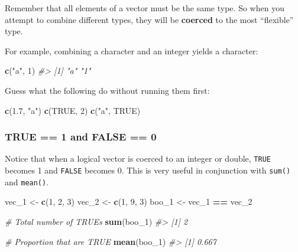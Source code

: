 \documentclass[]{book}
\newenvironment{Shaded}{\begin{snugshade}}{\end{snugshade}}
\newcommand{\KeywordTok}[1]{\textcolor[rgb]{0.13,0.29,0.53}{\textbf{#1}}}
\newcommand{\DecValTok}[1]{\textcolor[rgb]{0.00,0.00,0.81}{#1}}
\newcommand{\FloatTok}[1]{\textcolor[rgb]{0.00,0.00,0.81}{#1}}
\newcommand{\StringTok}[1]{\textcolor[rgb]{0.31,0.60,0.02}{#1}}
\newcommand{\CommentTok}[1]{\textcolor[rgb]{0.56,0.35,0.01}{\textit{#1}}}
\newcommand{\OtherTok}[1]{\textcolor[rgb]{0.56,0.35,0.01}{#1}}
\newcommand{\OperatorTok}[1]{\textcolor[rgb]{0.81,0.36,0.00}{\textbf{#1}}}
\newcommand{\NormalTok}[1]{#1}
\begin{document}
Remember that all elements of a vector must be the same type. So when
you attempt to combine different types, they will be \textbf{coerced} to
the most ``flexible'' type.

For example, combining a character and an integer yields a character:

\begin{Shaded}
\begin{Highlighting}[]
\KeywordTok{c}\NormalTok{(}\StringTok{"a"}\NormalTok{, }\DecValTok{1}\NormalTok{)}
\CommentTok{#> [1] "a" "1"}
\end{Highlighting}
\end{Shaded}

Guess what the following do without running them first:

\begin{Shaded}
\begin{Highlighting}[]
\KeywordTok{c}\NormalTok{(}\FloatTok{1.7}\NormalTok{, }\StringTok{"a"}\NormalTok{) }
\KeywordTok{c}\NormalTok{(}\OtherTok{TRUE}\NormalTok{, }\DecValTok{2}\NormalTok{) }
\KeywordTok{c}\NormalTok{(}\StringTok{"a"}\NormalTok{, }\OtherTok{TRUE}\NormalTok{) }
\end{Highlighting}
\end{Shaded}

\subsubsection*{TRUE == 1 and FALSE == 0}\label{true-1-and-false-0}

Notice that when a logical vector is coerced to an integer or double,
\texttt{TRUE} becomes 1 and \texttt{FALSE} becomes 0. This is very
useful in conjunction with \texttt{sum()} and \texttt{mean()}.

\begin{Shaded}
\begin{Highlighting}[]
\NormalTok{vec_}\DecValTok{1}\NormalTok{ <-}\StringTok{ }\KeywordTok{c}\NormalTok{(}\DecValTok{1}\NormalTok{, }\DecValTok{2}\NormalTok{, }\DecValTok{3}\NormalTok{)}
\NormalTok{vec_}\DecValTok{2}\NormalTok{ <-}\StringTok{ }\KeywordTok{c}\NormalTok{(}\DecValTok{1}\NormalTok{, }\DecValTok{9}\NormalTok{, }\DecValTok{3}\NormalTok{)}
\NormalTok{boo_}\DecValTok{1}\NormalTok{ <-}\StringTok{ }\NormalTok{vec_}\DecValTok{1} \OperatorTok{==}\StringTok{ }\NormalTok{vec_}\DecValTok{2}

\CommentTok{# Total number of TRUEs}
\KeywordTok{sum}\NormalTok{(boo_}\DecValTok{1}\NormalTok{)}
\CommentTok{#> [1] 2}

\CommentTok{# Proportion that are TRUE}
\KeywordTok{mean}\NormalTok{(boo_}\DecValTok{1}\NormalTok{)}
\CommentTok{#> [1] 0.667}
\end{Highlighting}
\end{Shaded}
\end{document}
